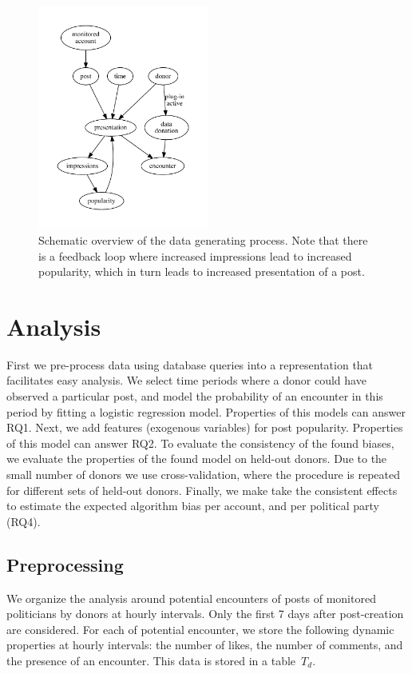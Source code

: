 \documentclass[a4paper]{article}
\begin{document}
\begin{figure}
    \centering
    \includegraphics[width=0.5\textwidth]{data_generation.pdf}
    \caption{Schematic overview of the data generating process. Note that
    there is a feedback loop where increased impressions lead to increased
    popularity, which in turn leads to increased presentation of a post.}
    \label{fig:data_generation}
\end{figure}

\section{Analysis}
First we pre-process data using database queries into a representation that
facilitates easy analysis. We select time periods where a donor could have
observed a particular post, and model the probability of an encounter in this
period by fitting a logistic regression model. Properties of this models can
answer RQ1. Next, we add features (exogenous variables) for post popularity.
Properties of this model can answer RQ2. To evaluate the consistency of the
found biases, we evaluate the properties of the found model on held-out
donors. Due to the small number of donors we use cross-validation, where the
procedure is repeated for different sets of held-out donors. Finally, we make
take the consistent effects to estimate the expected algorithm bias per
account, and per political party (RQ4).

\subsection{Preprocessing}
We organize the analysis around potential encounters of posts of monitored
politicians by donors at hourly intervals. Only the first 7 days after
post-creation are considered. For each of potential encounter, we store the
following dynamic properties at hourly intervals: the number of likes, the
number of comments, and the presence of an encounter. This data is stored in
a table~$T_d$.
\end{document}
